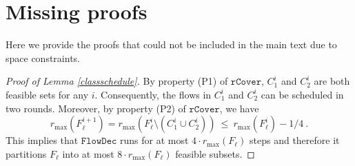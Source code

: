 \documentclass[a4paper,UKenglish]{lipics-v2016}
\theoremstyle{plain}
\begin{document}


\newpage
\appendix
\section{Missing proofs}
Here we provide the proofs that could not be included in the main text due to space constraints.

\begin{proof}[Proof of Lemma \ref{classschedule}]
By property (P1) of $\mathtt{rCover}$, $C^i_1$ and $C^i_2$ are both feasible sets for any $i$. Consequently, the flows in $C^i_1$ and $C^i_2$ can be scheduled in two rounds. Moreover, by property (P2) of $\mathtt{rCover}$, we have
\begin{equation}
r_{\max}(F^{i+1}_\ell) = r_{\max}(F^{i}_\ell\setminus(C^i_1\cup C^i_2))~\leq~r_{\max}(F^i_\ell)- 1/4~.
\end{equation}
This implies that $\mathtt{FlowDec}$ runs for at most $4\cdot r_{\max}(F_\ell)$ steps and therefore it partitions $F_\ell$ into at most $8\cdot r_{\max}(F_\ell)$ feasible subsets.
\end{proof}
\end{document}
